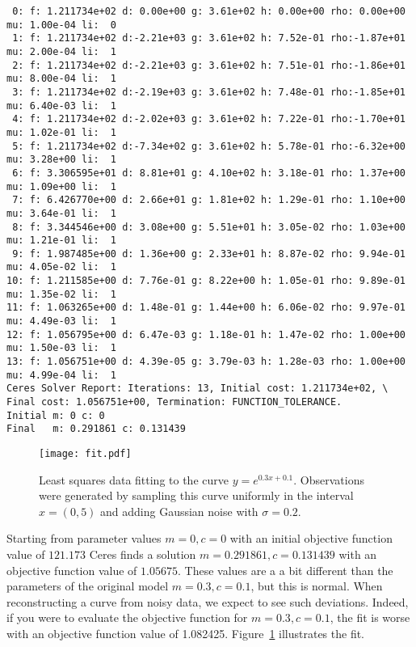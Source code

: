 \begin{verbatim}
 0: f: 1.211734e+02 d: 0.00e+00 g: 3.61e+02 h: 0.00e+00 rho: 0.00e+00 mu: 1.00e-04 li:  0
 1: f: 1.211734e+02 d:-2.21e+03 g: 3.61e+02 h: 7.52e-01 rho:-1.87e+01 mu: 2.00e-04 li:  1
 2: f: 1.211734e+02 d:-2.21e+03 g: 3.61e+02 h: 7.51e-01 rho:-1.86e+01 mu: 8.00e-04 li:  1
 3: f: 1.211734e+02 d:-2.19e+03 g: 3.61e+02 h: 7.48e-01 rho:-1.85e+01 mu: 6.40e-03 li:  1
 4: f: 1.211734e+02 d:-2.02e+03 g: 3.61e+02 h: 7.22e-01 rho:-1.70e+01 mu: 1.02e-01 li:  1
 5: f: 1.211734e+02 d:-7.34e+02 g: 3.61e+02 h: 5.78e-01 rho:-6.32e+00 mu: 3.28e+00 li:  1
 6: f: 3.306595e+01 d: 8.81e+01 g: 4.10e+02 h: 3.18e-01 rho: 1.37e+00 mu: 1.09e+00 li:  1
 7: f: 6.426770e+00 d: 2.66e+01 g: 1.81e+02 h: 1.29e-01 rho: 1.10e+00 mu: 3.64e-01 li:  1
 8: f: 3.344546e+00 d: 3.08e+00 g: 5.51e+01 h: 3.05e-02 rho: 1.03e+00 mu: 1.21e-01 li:  1
 9: f: 1.987485e+00 d: 1.36e+00 g: 2.33e+01 h: 8.87e-02 rho: 9.94e-01 mu: 4.05e-02 li:  1
10: f: 1.211585e+00 d: 7.76e-01 g: 8.22e+00 h: 1.05e-01 rho: 9.89e-01 mu: 1.35e-02 li:  1
11: f: 1.063265e+00 d: 1.48e-01 g: 1.44e+00 h: 6.06e-02 rho: 9.97e-01 mu: 4.49e-03 li:  1
12: f: 1.056795e+00 d: 6.47e-03 g: 1.18e-01 h: 1.47e-02 rho: 1.00e+00 mu: 1.50e-03 li:  1
13: f: 1.056751e+00 d: 4.39e-05 g: 3.79e-03 h: 1.28e-03 rho: 1.00e+00 mu: 4.99e-04 li:  1
Ceres Solver Report: Iterations: 13, Initial cost: 1.211734e+02, \
Final cost: 1.056751e+00, Termination: FUNCTION_TOLERANCE.
Initial m: 0 c: 0
Final   m: 0.291861 c: 0.131439
\end{verbatim}

\begin{figure}[t]
	\begin{center}
	\texttt{[image: fit.pdf]}
	\caption{Least squares data fitting to the curve $y = e^{0.3x + 0.1}$. Observations were generated by sampling this curve uniformly in the interval $x=(0,5)$ and adding Gaussian noise with $\sigma = 0.2$.\label{fig:exponential}}
\end{center}
\end{figure}

Starting from parameter values $m = 0, c=0$ with an initial objective function value of $121.173$ Ceres finds a solution $m= 0.291861, c = 0.131439$ with an objective function value of $1.05675$. These values are a a bit different than the parameters of the original model $m=0.3, c= 0.1$, but this is normal. When reconstructing a curve from noisy data, we expect to see such deviations. Indeed, if you were to evaluate the objective function for $m=0.3, c=0.1$, the fit is worse with an objective function value of 1.082425. Figure~\ref{fig:exponential} illustrates the fit.

